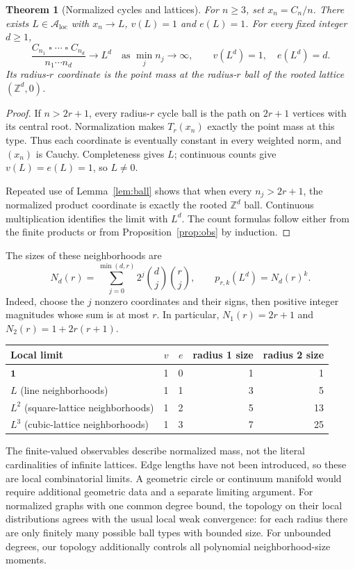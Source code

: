 \documentclass[11pt]{article}
\newtheorem{theorem}{Theorem}
\theoremstyle{definition}\newtheorem{definition}[theorem]{Definition}
\newcommand{\Z}{\mathbb Z}
\newcommand{\A}{\mathcal A}
\newcommand{\one}{\mathbf 1}
\newcommand{\sq}{\mathbin{\square}}
\begin{document}
\begin{theorem}[Normalized cycles and lattices]\label{thm:cycles}
For $n\ge3$, set $x_n=C_n/n$. There exists $L\in\A_{\mathrm{loc}}$ with $x_n\to L$, $v(L)=1$ and $e(L)=1$. For every fixed integer $d\ge1$,
\[
 \frac{C_{n_1}\sq\cdots\sq C_{n_d}}{n_1\cdots n_d}
 \longrightarrow L^d\quad\text{as }\min_jn_j\to\infty,
 \qquad v(L^d)=1,\quad e(L^d)=d.
\]
Its radius-$r$ coordinate is the point mass at the radius-$r$ ball of the rooted lattice $(\Z^d,0)$.
\end{theorem}
\begin{proof}
If $n>2r+1$, every radius-$r$ cycle ball is the path on $2r+1$ vertices with its central root. Normalization makes $T_r(x_n)$ exactly the point mass at this type. Thus each coordinate is eventually constant in every weighted norm, and $(x_n)$ is Cauchy. Completeness gives $L$; continuous counts give $v(L)=e(L)=1$, so $L\ne0$.

Repeated use of Lemma~\ref{lem:ball} shows that when every $n_j>2r+1$, the normalized product coordinate is exactly the rooted $\Z^d$ ball. Continuous multiplication identifies the limit with $L^d$. The count formulas follow either from the finite products or from Proposition~\ref{prop:obs} by induction.
\end{proof}

The sizes of these neighborhoods are
\[
 N_d(r)=\sum_{j=0}^{\min(d,r)}2^j\binom dj\binom rj,
 \qquad p_{r,k}(L^d)=N_d(r)^k.
\]
Indeed, choose the $j$ nonzero coordinates and their signs, then positive integer magnitudes whose sum is at most $r$. In particular, $N_1(r)=2r+1$ and $N_2(r)=1+2r(r+1)$.

\begin{center}
\begin{tabular}{lrrrr}
\toprule
Local limit & $v$ & $e$ & radius 1 size & radius 2 size\\
\midrule
$\one$ & 1 & 0 & 1 & 1\\
$L$ (line neighborhoods) & 1 & 1 & 3 & 5\\
$L^2$ (square-lattice neighborhoods) & 1 & 2 & 5 & 13\\
$L^3$ (cubic-lattice neighborhoods) & 1 & 3 & 7 & 25\\
\bottomrule
\end{tabular}
\end{center}

The finite-valued observables describe normalized mass, not the literal cardinalities of infinite lattices. Edge lengths have not been introduced, so these are local combinatorial limits. A geometric circle or continuum manifold would require additional geometric data and a separate limiting argument. For normalized graphs with one common degree bound, the topology on their local distributions agrees with the usual local weak convergence: for each radius there are only finitely many possible ball types with bounded size. For unbounded degrees, our topology additionally controls all polynomial neighborhood-size moments.
\end{document}
